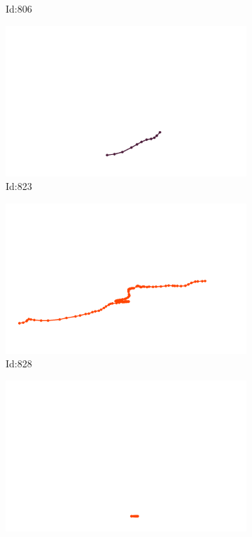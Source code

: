 \documentclass[12pt,twoside]{report}
\begin{document}
\begin{figure}
\begin{subfigure}[b]{0.20\textwidth}
\caption{Id:806}
\end{subfigure}
\begin{subfigure}[b]{0.20\textwidth}
\centering
\includegraphics[width=\textwidth]{../trajectories/823.png}
\caption{Id:823}
\end{subfigure}
\begin{subfigure}[b]{0.20\textwidth}
\centering
\includegraphics[width=\textwidth]{../trajectories/828.png}
\caption{Id:828}
\end{subfigure}
\begin{subfigure}[b]{0.20\textwidth}
\centering
\includegraphics[width=\textwidth]{../trajectories/835.png}

\end{subfigure}
\end{figure}
\end{document}

